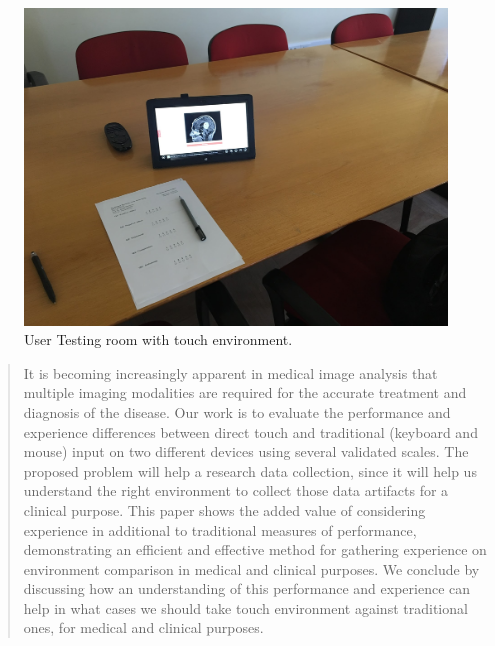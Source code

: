 \documentclass{sigchi}
\begin{document}
\begin{figure}[h]
\centering
\includegraphics[width=0.8\columnwidth]{IMG_4979.JPG}
\caption{User Testing room with touch environment.}
\label{fig:Fig2}
\end{figure}

\begin{abstract}

It is becoming increasingly apparent in medical image analysis that multiple imaging modalities are required for the accurate treatment and diagnosis of the disease. Our work is to  evaluate the performance and experience differences between direct touch and traditional (keyboard and mouse) input on two different devices using several validated scales. The proposed problem will help a research data collection, since it will help us understand the right environment to collect those data artifacts for a clinical purpose. This paper shows the added value of considering experience in additional to traditional measures of performance, demonstrating an efficient and effective method for gathering experience on environment comparison in medical and clinical purposes. We conclude by discussing how an understanding of this performance and experience can help in what cases we should take touch environment against traditional ones, for medical and clinical purposes.

\end{abstract}


\end{document}
